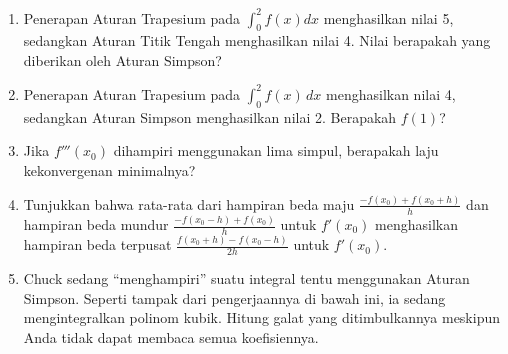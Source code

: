 \begin{small}
\begin{enumerate}
\begin{enumerate}
\item Berapakah laju kekonvergenannya?
\item Berapakah derajat ketelitiannya?
\item Gunakan metode tersebut untuk menghampiri $\int_{0}^{\pi}\sin x\,dx$.
\item Tentukan batas galat hampiran ini.
\item Bandingkan batas tersebut dengan galat sebenarnya.
\end{enumerate}
\item Penerapan Aturan Trapesium pada ${\displaystyle \int_{0}^{2}f(x)dx}$
menghasilkan nilai 5, sedangkan Aturan Titik Tengah menghasilkan nilai
4. Nilai berapakah yang diberikan oleh Aturan Simpson?
\item \label{exc:calculusErrors-31}Penerapan Aturan Trapesium pada $\int_{0}^{2}f(x)\,dx$
menghasilkan nilai 4, sedangkan Aturan Simpson menghasilkan nilai
2. Berapakah $f(1)$? \hasananswer 
\item \label{exc:calculusErrors-32}Jika $f'''(x_{0})$ dihampiri menggunakan
lima simpul, berapakah laju kekonvergenan minimalnya?  \hasananswer 
\item Tunjukkan bahwa rata-rata dari hampiran beda maju $\frac{-f(x_{0})+f(x_{0}+h)}{h}$
dan hampiran beda mundur $\frac{-f(x_{0}-h)+f(x_{0})}{h}$ untuk $f'(x_{0})$
menghasilkan hampiran beda terpusat $\frac{f(x_{0}+h)-f(x_{0}-h)}{2h}$
untuk $f'(x_{0})$.
\item \label{exc:calculusErrors-33}Chuck sedang ``menghampiri'' suatu
integral tentu menggunakan Aturan Simpson. Seperti tampak dari pengerjaannya
di bawah ini, ia sedang mengintegralkan polinom kubik. Hitung galat
yang ditimbulkannya meskipun Anda tidak dapat membaca semua koefisiennya. \hasananswer 


\end{enumerate}
\end{small}
